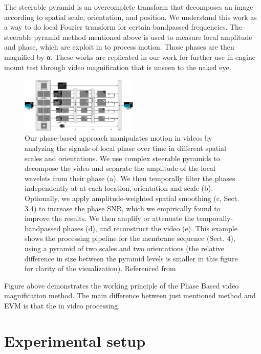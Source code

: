 \documentclass{IEEEtran}
\begin{document}
The steerable pyramid \cite{119725} is an overcomplete transform that decomposes an image according to spatial scale, orientation, and position. We understand this work as a way to do local Fourier transform for certain bandpassed frequencies. The steerable pyramid method mentioned above is used to measure local amplitude and phase, which are exploit in \cite{Wadhwa:2013:PVM:2461912.2461966} to process motion. Those phases are then magnified by α. These works are replicated in our work for further use in engine mount test through video magnification that is unseen to the naked eye.

\begin{figure}[h]
	\centering
	\includegraphics[width=0.5\textwidth]{phases}
	\caption{Our phase-based approach manipulates motion in videos by analyzing the signals of local phase over time in different spatial scales and orientations. We use complex steerable pyramids to decompose the video and separate the amplitude of the local wavelets from their phase (a). We then temporally filter the phases independently at at each location, orientation and scale (b). Optionally, we apply amplitude-weighted spatial smoothing (c, Sect. 3.4) to increase the phase SNR, which we empirically found to improve the results. We then amplify or attenuate the temporally-bandpassed phases (d), and reconstruct the video (e). This example shows the processing pipeline for the membrane sequence (Sect. 4), using a pyramid of two scales and two orientations (the relative difference in size between the pyramid levels is smaller in this figure for clarity of the visualization). Referenced from \cite{Wadhwa:2013:PVM:2461912.2461966}}
	\label{fig:phases}
\end{figure}

Figure above demonstrates the working principle of the Phase Based video magnification method. The main difference between just mentioned method and EVM is that the in video processing.

\section{Experimental setup}
\end{document}
